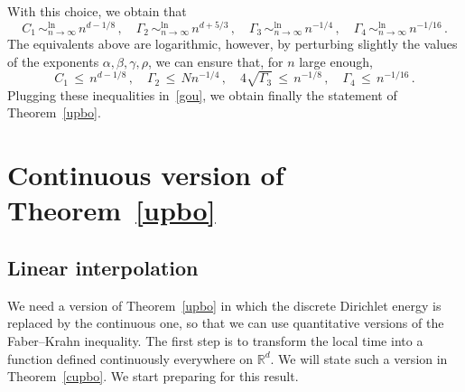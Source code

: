 \documentclass[AHL, Unicode, longabstracts, published]{cedram}
\newcommand*\lsim{\mathop{\sim}^{\ln}_{n\to\infty}}
\newcommand*\R{\mathbb{R}}
\begin{document}
With this choice, we obtain that
\begin{equation*}
C_1\,\lsim\,n^{d-1/8}\,,
\quad
\Gamma_2\,\lsim\,n^{d+5/3}\,,
\quad
\Gamma_3\,\lsim\,n^{-1/4}\,,
\quad
\Gamma_4\,\lsim\,n^{-1/16}\,.
\end{equation*}
The equivalents above are logarithmic, however, by perturbing slightly the values of the exponents $\alpha,\beta,\gamma,\rho$, we can ensure that, for $n$ large enough,
\begin{equation*}
C_1\,\leq\,n^{d-1/8}\,,
\quad {\Gamma_2}\,\leq\,Nn^{-1/4}\,,
\quad 4\sqrt{\Gamma_3}\,\leq\,n^{-1/8}\,,
\quad
\Gamma_4\,\leq\,n^{-1/16}\,.
\end{equation*}
Plugging these inequalities in~\eqref{gou}, we obtain finally the statement of Theorem~\ref{upbo}.

\section{Continuous version of Theorem~\ref{upbo}}\label{S:continuous}

\subsection{Linear interpolation}\label{lini}

We need a version of Theorem~\ref{upbo} in which the discrete Dirichlet energy is replaced by the continuous one, so that we can use quantitative versions of the Faber--Krahn inequality. The first step is to transform the local time into a function defined continuously everywhere on $\R^d$. We will state such a version in Theorem~\ref{cupbo}. We start preparing for this result.
\end{document}
